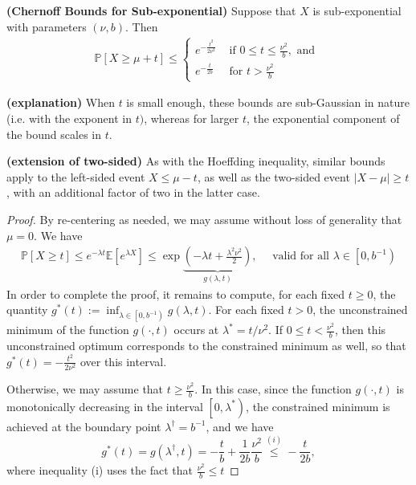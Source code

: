 \documentclass{article}
\newcommand{\bfs}[1]{\textbf{({#1})}}
\begin{document}
\begin{thma}{\bfs{Chernoff Bounds for Sub-exponential}}\label{thmchernoffexp}
 Suppose that $X$ is sub-exponential with parameters $(\nu, b)$. Then
\begin{align}
   \mathbb{P}[X \geq \mu+t] \leq\left\{\begin{array}{ll}
e^{-\frac{t^{2}}{2 \nu^{2}}} & \text { if } 0 \leq t \leq \frac{\nu^{2}}{b}, \text { and } \\
e^{-\frac{t}{2 b}} & \text { for } t>\frac{\nu^{2}}{b}\label{eq:subbb}
\end{array}\right. 
\end{align}
\end{thma}
\begin{rema}{\bfs{explanation}}\label{explaaa}
 When $t$ is small enough, these bounds are sub-Gaussian in nature (i.e. with the exponent  in $t)$, whereas for larger $t$, the exponential component of the bound scales  in $t$.
\end{rema}
\begin{rema}{\bfs{extension of two-sided}}
 As with the Hoeffding inequality, similar bounds apply to the left-sided event $X \leq \mu-t$, as well as the two-sided event $|X-\mu| \geq t$, with an additional factor of two in the latter case.
\end{rema}
\begin{proof}
By re-centering as needed, we may assume without loss of generality that $\mu=0$. We have 
\begin{align*}
    \mathbb{P}[X \geq t] \leq e^{-\lambda t} \mathbb{E}\left[e^{\lambda X}\right] \leq \exp \underbrace{\left(-\lambda t+\frac{\lambda^{2} \nu^{2}}{2}\right)}_{g(\lambda, t)}, \quad\text{ valid for all } \lambda \in\left[0, b^{-1}\right)
\end{align*}
In order to complete the proof, it remains to compute, for each fixed $t \geq 0$, the quantity $g^{*}(t):=\inf _{\lambda \in\left[0, b^{-1}\right)} g(\lambda, t) .$ For each fixed $t>0$, the unconstrained minimum of the function $g(\cdot, t)$ occurs at $\lambda^{*}=t / \nu^{2} .$ If $0 \leq t<\frac{\nu^{2}}{b}$, then this unconstrained optimum corresponds to the constrained minimum as well, so that $g^{*}(t)=-\frac{t^{2}}{2 \nu^{2}}$ over this interval. 

Otherwise, we may assume that $t \geq \frac{\nu^{2}}{b} .$ In this case, since the function $g(\cdot, t)$ is monotonically decreasing in the interval $\left[0, \lambda^{*}\right)$, the constrained minimum is achieved at the boundary point $\lambda^{\dagger}=b^{-1}$, and we have
$$
g^{*}(t)=g\left(\lambda^{\dagger}, t\right)=-\frac{t}{b}+\frac{1}{2 b} \frac{\nu^{2}}{b} \stackrel{(i)}{\leq}-\frac{t}{2 b},
$$
where inequality (i) uses the fact that $\frac{\nu^{2}}{b} \leq t$
\end{proof}
\end{document}
